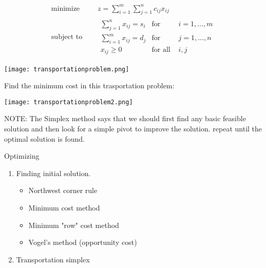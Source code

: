 \documentclass{beamer}
\begin{document}
\begin{frame}
  \begin{equation*}
    \begin{aligned}
      \text{minimize } \quad & z = \sum_{i=1}^m \sum_{j=1}^n c_{ij}x_{ij} \\
      \text{subject to }\quad &
      \begin{array}{rcl}
        \sum_{j=1}^n x_{ij}= s_i&\text{for }& i=1,\ldots,m \\
        \sum_{i=1}^m x_{ij} = d_j &\text{for }& j=1,\ldots,n \\
        x_{ij} \geq 0 & \text{for all } & i,j
      \end{array}
    \end{aligned}
  \end{equation*}
  \begin{center}
    \texttt{[image: transportationproblem.png]}
  \end{center}
\end{frame}

\begin{frame}
\begin{Exercise}
  Find the minimum cost in this trasportation problem:\cite{carter}
  \begin{center}
    \texttt{[image: transportationproblem2.png]}
  \end{center}
  NOTE: The Simplex method says that we should first find any basic feasible solution and then look for a simple pivot to improve the solution. repeat until the optimal solution is found.
\end{Exercise}
\end{frame}

\begin{frame}{Optimizing}
\begin{enumerate}
  \item Finding initial solution.
  \begin{itemize}
  \item Northwest corner rule
  \item Minimum cost method
  \item Minimum "row" cost method
  \item Vogel's method (opportunity cost)
  \end{itemize}
  \item Transportation simplex
\end{enumerate}
\end{frame}
\end{document}
